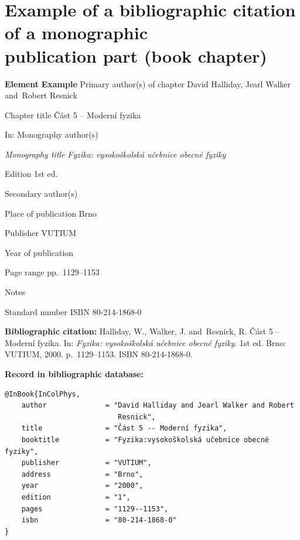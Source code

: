 
\newpage
\section*{Example of a bibliographic citation of a monographic \\
publication part (book chapter)}
\label{pr-kapitola-monografie}
\begin{tabbing} 
\zarazky
\textbf{Element} \> \textbf{Example} \odradkovani
Primary author(s) of chapter \>
David {\sc Halliday}, Jearl {\sc Walker} and~Robert {\sc Resnick}

\odradkovani
Chapter title \>
Část 5 -- Moderní fyzika

\odradkovani
In: Monography author(s)\footnotemark[1] \>

\odradkovani
{\em Monography title} \>
{\em Fyzika: vysokoškolská učebnice obecné fyziky}

\odradkovani
Edition \>
1st ed.

\odradkovani
Secondary author(s)\footnotemark[2] \>

\odradkovani
Place of publication \>
Brno

\odradkovani
Publisher \>
VUTIUM

\odradkovani
Year of publication 

\odradkovani
Page range \>
pp.~1129--1153

\odradkovani
Notes\footnotemark[3] \>

\odradkovani
Standard number \>
ISBN 80-214-1868-0
\odradkovani
\end{tabbing}

\noindent \textbf{Bibliographic citation:} \odradkovani
{\sc Halliday}, W., {\sc Walker}, J. and~{\sc Resnick}, R. Část 5 -- Moderní fyzika.
In: {\em Fyzika: vysokoškolská učebnice obecné fyziky}. 1st ed. Brno: VUTIUM, 2000. p.~1129--1153. ISBN 80-214-1868-0.

\bigskip \bigskip
\noindent \textbf{Record in bibliographic database:}
\vspace{-0.5em}
\begin{verbatim}
@InBook{InColPhys,
    author              = "David Halliday and Jearl Walker and Robert 
                           Resnick",
    title               = "Část 5 -- Moderní fyzika",
    booktitle           = "Fyzika:vysokoškolská učebnice obecné fyziky",
    publisher           = "VUTIUM",
    address             = "Brno",
    year                = "2000",
    edition             = "1",
    pages               = "1129--1153",
    isbn                = "80-214-1868-0"
}
\end{verbatim}

